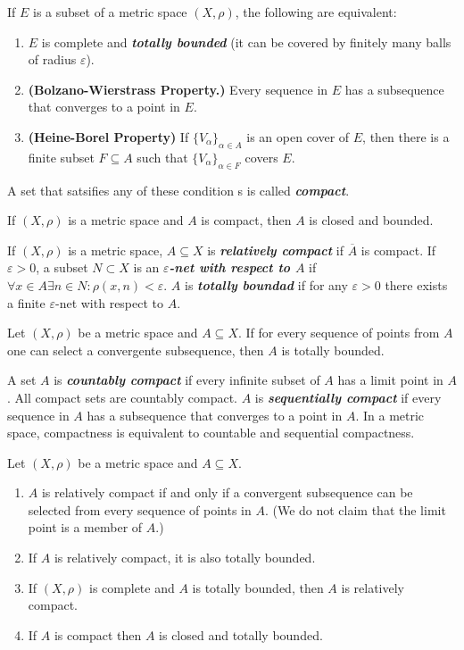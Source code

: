 \documentclass{article}
\theoremstyle{definition}
\numberwithin{equation}{section}
\begin{document}
	\begin{thm}
		If $E$ is a subset of a metric space $(X,\rho)$, the following are equivalent:
		\begin{enumerate}
			\item $E$ is complete and \textbf{\textit{totally bounded}} (it can be covered by finitely many balls of radius $\varepsilon$).
			\item \textbf{(Bolzano-Wierstrass Property.)} Every sequence in $E$ has a subsequence that converges to a point in $E$.
			\item \textbf{(Heine-Borel Property)} If $\{V_\alpha\}_{\alpha\in A}$ is an open cover of $E$, then there is a finite subset $F\subseteq A$ such that $\{V_\alpha\}_{\alpha\in F}$ covers $E$.
		\end{enumerate}
		A set that satsifies any of these condition
		s is called \textbf{\textit{compact}}.
	\end{thm}
	\begin{thm}
		If $(X,\rho)$ is a metric space and $A$ is compact, then $A$ is closed and bounded.
	\end{thm}
	If $(X,\rho)$ is a metric space, $A\subseteq X$ is \textbf{\textit{relatively compact}} if $\overline{A}$ is compact. If $\varepsilon>0$, a subset $N\subset X$ is an \textbf{\textit{$\varepsilon$-net with respect to $A$}} if $\forall x\in A\exists n\in N:\rho(x,n)<\varepsilon$. $A$ is \textbf{\textit{totally boundad}} if for any $\varepsilon>0$ there exists a finite $\varepsilon$-net with respect to $A$.
	
	\begin{thm}
		Let $(X,\rho)$ be a metric space and $A\subseteq X$. If for every sequence of points from $A$ one can select a convergente subsequence, then $A$ is totally bounded.
	\end{thm}
	A set $A$ is \textbf{\textit{countably compact}} if every infinite subset of $A$ has a limit point in $A$. All compact sets are countably compact. $A$ is \textbf{\textit{sequentially compact}} if every sequence in $A$ has a subsequence that converges to a point in $A$. In a metric space, compactness is equivalent to countable and sequential compactness.
	
	\begin{thm} Let $(X,\rho)$ be a metric space and $A\subseteq X$.
		\begin{enumerate}
			\item $A$ is relatively compact if and only if a convergent subsequence can be selected from every sequence of points in $A$. (We do not claim that the limit point is a member of $A$.)
			\item If $A$ is relatively compact, it is also totally bounded.
			\item If $(X,\rho)$ is complete and $A$ is totally bounded, then $A$ is relatively compact.
			\item If $A$ is compact then $A$ is closed and totally bounded.
		\end{enumerate}
	\end{thm}
	
\end{document}

